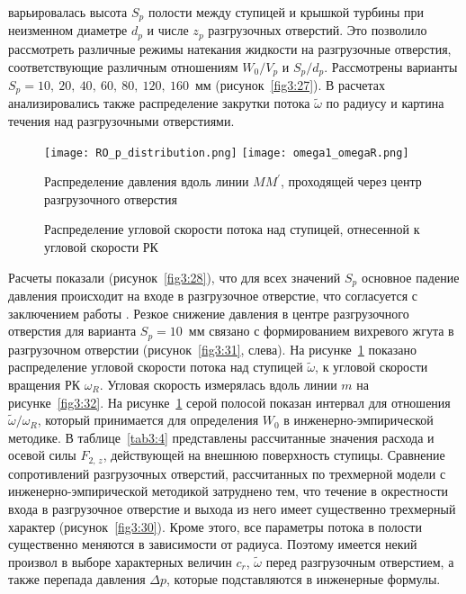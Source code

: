 варьировалась высота $S_p$ полости между ступицей и крышкой турбины при неизменном диаметре $d_p$ и 
числе $z_p$ разгрузочных отверстий. Это позволило рассмотреть различные режимы натекания жидкости 
на разгрузочные отверстия, соответствующие различным отношениям $W_0/V_p$  и $S_p/d_p$. Рассмотрены 
варианты $S_p = 10,\ 20,\ 40,\ 60,\ 80,\ 120,\ 160$~мм (рисунок~\ref{fig3:27}). В расчетах анализировались 
также распределение закрутки потока $\tilde{\omega}$ по радиусу и картина течения над 
разгрузочными отверстиями.
\begin{figure}[!b]
  \texttt{[image: RO\_p\_distribution.png]}\hfill 
  \texttt{[image: omega1\_omegaR.png]}\\[-5mm]
  \parbox[t]{0.48\textwidth}{\caption{Распределение давления вдоль линии $MM^\prime$, 
            проходящей через центр разгрузочного отверстия} \label{fig3:28}}\hfill
  \parbox[t]{0.48\textwidth}{\caption{Распределение угловой скорости потока над ступицей, 
            отнесенной к угловой скорости РК} \label{fig3:29}}
\end{figure}

Расчеты показали (рисунок~\ref{fig3:28}), что для всех значений $S_p$ основное падение давления происходит 
на входе в разгрузочное отверстие, что согласуется с заключением работы \cite{makar}. Резкое 
снижение давления в центре разгрузочного отверстия для варианта $S_p = 10$~мм связано с формированием 
вихревого жгута в разгрузочном отверстии (рисунок~\ref{fig3:31}, слева). 
На рисунке~\ref{fig3:29} показано распределение угловой скорости потока над ступицей $\tilde{\omega}$, к угловой 
скорости вращения РК $\omega_R$. Угловая скорость измерялась вдоль линии $m$ на рисунке~\ref{fig3:32}. 
На рисунке~\ref{fig3:29} серой полосой показан интервал для отношения $\tilde{\omega}/\omega_R$, 
который принимается для определения $W_0$ в инженерно-эмпирической методике.  
В таблице~\ref{tab3:4} представлены рассчитанные значения расхода 
и осевой силы $F_{2,\,z}$, действующей на внешнюю поверхность ступицы. 
Сравнение сопротивлений разгрузочных отверстий, рассчитанных по 
трехмерной модели с инженерно-эмпирической методикой затруднено тем, что течение в окрестности входа 
в разгрузочное отверстие и выхода из него имеет существенно трехмерный характер (рисунок~\ref{fig3:30}). 
Кроме этого, все параметры потока в полости существенно меняются в зависимости от радиуса. Поэтому имеется 
некий произвол в выборе характерных величин $c_r$, $\tilde{\omega}$ перед разгрузочным отверстием, 
а также перепада давления $\Delta p$, которые подставляются в инженерные формулы. 


